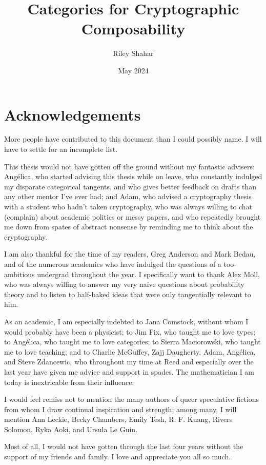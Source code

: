 \documentclass[12pt,twoside]{reedthesis}
\title{Categories for Cryptographic Composability} %
\author{Riley Shahar}
\date{May 2024}
\begin{document}
\maketitle
\frontmatter
\pagestyle{empty} %

\chapter*{Acknowledgements}

More people have contributed to this document than I could possibly name. I will
have to settle for an incomplete list.

This thesis would not have gotten off the ground without my fantastic advisers:
Angélica, who started advising this thesis while on leave, who constantly
indulged my disparate categorical tangents, and who gives better feedback on
drafts than any other mentor I've ever had; and Adam, who advised a cryptography
thesis with a student who hadn't taken cryptography, who was always willing to
chat (complain) about academic politics or messy papers, and who repeatedly
brought me down from spates of abstract nonsense by reminding me to think about
the cryptography.

I am also thankful for the time of my readers, Greg Anderson and Mark Bedau, and
of the numerous academics who have indulged the questions of a too-ambitious
undergrad throughout the year. I specifically want to thank Alex Moll, who was
always willing to answer my very naive questions about probability theory and to
listen to half-baked ideas that were only tangentially relevant to him.

As an academic, I am especially indebted to Jana Comstock, without whom I would
probably have been a physicist; to Jim Fix, who taught me to love types; to
Angélica, who taught me to love categories; to Sierra Maciorowski, who taught me
to love teaching; and to Charlie McGuffey, Zajj Daugherty, Adam, Angélica, and
Steve Zdancewic, who throughout my time at Reed and especially over the last
year have given me advice and support in spades. The mathematician I am
today is inextricable from their influence.

I would feel remiss not to mention the many authors of queer speculative
fictions from whom I draw continual inspiration and strength; among many, I will
mention Ann Leckie, Becky Chambers, Emily Tesh, R. F. Kuang, Rivers Solomon,
Ryka Aoki, and Ursula Le Guin.

Most of all, I would not have gotten through the last four years without the
support of my friends and family. I love and appreciate you all so much.
\end{document}
